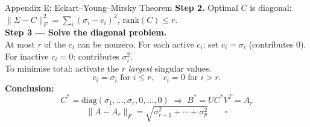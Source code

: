 \documentclass{beamer}
\begin{document}
\begin{frame}{Appendix E: Eckart--Young--Mirsky Theorem}
\textbf{Step 2.} Optimal $C$ is diagonal: $\|\Sigma-C\|_F^2=\sum_i(\sigma_i-c_i)^2$, $\mathrm{rank}(C)\leq r$.\\[0.4em]
\textbf{Step 3 — Solve the diagonal problem.}\\
At most $r$ of the $c_i$ can be nonzero. For each active $c_i$: set $c_i=\sigma_i$ (contributes $0$). For inactive $c_i=0$: contributes $\sigma_i^2$.\\[0.3em]
To minimise total: activate the $r$ \emph{largest} singular values.
\[
c_i = \sigma_i \text{ for } i\leq r, \quad c_i=0 \text{ for } i>r.
\]
\textbf{Conclusion:}
\[
C^* = \mathrm{diag}(\sigma_1,\ldots,\sigma_r,0,\ldots,0)
\;\Rightarrow\;
B^* = UC^*V^T = A_r
\]
\[
\|A-A_r\|_F = \sqrt{\sigma_{r+1}^2+\cdots+\sigma_p^2} \qquad \square
\]
\end{frame}
\end{document}
